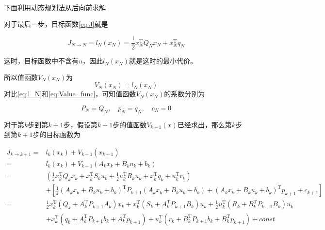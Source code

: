 \documentclass[withoutpreface,bwprint]{NoteBook}
\begin{document}
下面利用动态规划法从后向前求解

对于最后一步，目标函数\cref{eq:J}就是

\begin{equation}
\label{eq:J_N_to_N}
J_{N\rightarrow N}=l_N\left( x_N \right) = \frac{1}{2}x_{N}^\mathrm{T} Q_{N} x_{N} + x_{N}^\mathrm{T}q_{N} 
\end{equation}

这时，目标函数中不含有$u$，因此$l_N\left( x_N \right)$就是这时的最小代价。

所以值函数$V_N(x_N)$为
$$
V_N(x_N)= l_N\left( x_N \right)
$$
对比\cref{eq:l_N}和\cref{eq:Value_func}，可知值函数$V_N(x_N)$的系数分别为

\begin{equation}
\label{eq:V_N_params}
P_N = Q_N, \quad p_N=q_N, \quad c_N = 0
\end{equation}

对于第$k$步到第$k+1$步，假设第$k+1$步的值函数$V_{k+1}(x)$已经求出，那么第$k$步到第$k+1$步的目标函数为

\begin{align}
\label{eq:J_k_to_k_plus_1}
    J_{k\rightarrow k+1}
    =& l_k\left( x_k \right)+ V_{k+1}(x_{k+1}) \nonumber \\

    =& l_k\left( x_k \right)+ V_{k+1}(A_k x_{k}+B_k u_{k} + b_k) \nonumber \\

    =& \left( \frac{1}{2}x_k^\mathrm{T} Q_k x_k
    + x_k^\mathrm{T} S_k u_k
    + \frac{1}{2}u_k^\mathrm{T} R_k u_k + x_k^\mathrm{T}q_k
    + u_k^\mathrm{T} r_k \right) \nonumber \\
    & + \left[\frac{1}{2}(A_k x_{k}+B_k u_{k}+ b_k)^\mathrm{T} P_{k+1} (A_k x_{k}+B_k u_{k} + b_k) 
    + (A_k x_{k}+B_k u_{k} + b_k)^\mathrm{T}p_{k+1}
    + c_{k+1}\right] \nonumber \\

    =& \frac{1}{2}x_k^\mathrm{T} (Q_k + A_k^\mathrm{T}P_{k+1}A_k) x_k
    + x_k^\mathrm{T}(S_k + A_k^\mathrm{T}P_{k+1}B_k) u_k 
    + \frac{1}{2}u_k^\mathrm{T} (R_k + B_k^\mathrm{T}P_{k+1}B_k) u_k \nonumber \\
    & + x_k^\mathrm{T}\left( q_k + A_k^\mathrm{T}P_{k+1}b_k+ A_k^\mathrm{T} p_{k+1} \right)
    + u_k^\mathrm{T}\left( r_k + B_{k}^\mathrm{T}P_{k+1}b_{k} + B_{k}^\mathrm{T}p_{k+1} \right)
    + const
\end{align}
\end{document}
